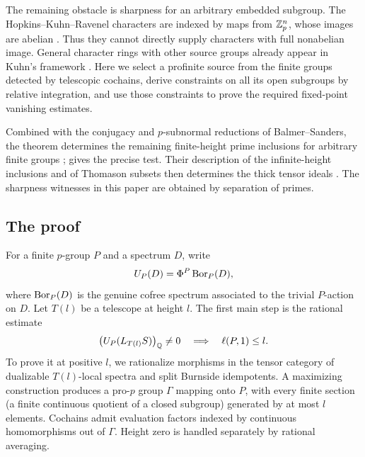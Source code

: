 The remaining obstacle is sharpness for an arbitrary embedded
subgroup. The Hopkins--Kuhn--Ravenel characters are indexed by maps
from \(\mathbb Z_p^n\), whose images are abelian \cite[Theorem~C]{HKR}.
Thus they cannot directly supply characters with full nonabelian
image. General character rings with other source groups already
appear in Kuhn's framework \cite[Section~2]{KuhnCharacters}.
Here we select a profinite source from the finite groups detected by
telescopic cochains, derive constraints on all its open subgroups by
relative integration, and use those constraints to prove the required
fixed-point vanishing estimates.

Combined with the conjugacy and \(p\)-subnormal reductions of
Balmer--Sanders, the theorem determines the remaining finite-height
prime inclusions for arbitrary finite groups
\cite[Proposition~6.11]{BS};  gives the
precise test. Their description of the infinite-height inclusions
and of Thomason subsets then determines the thick tensor ideals
\cite[Corollaries~8.19, 10.5, and~10.6]{BS}. The sharpness witnesses
in this paper are obtained by separation of primes.

\subsection*{The proof}

For a finite \(p\)-group \(P\) and a spectrum \(D\), write
\[
 U_P(D)=\Phi^P\operatorname{Bor}_P(D),
\]
where \(\operatorname{Bor}_P(D)\) is the genuine cofree spectrum associated to the trivial \(P\)-action on \(D\). Let \(T(l)\) be a telescope at height \(l\). The first main step is the rational estimate
\begin{equation}\label{eq:intro-rational}
 \bigl(U_P(L_{T(l)}S)\bigr)_{\mathbb Q}\ne0
 \quad\Longrightarrow\quad \ell(P,1)\le l.
\end{equation}
To prove it at positive \(l\), we rationalize morphisms in the tensor category of dualizable \(T(l)\)-local spectra and split Burnside idempotents. A maximizing construction produces a pro-\(p\) group \(\Gamma\) mapping onto \(P\), with every finite section (a finite continuous quotient of a closed subgroup) generated by at most \(l\) elements. Cochains admit evaluation factors indexed by continuous homomorphisms out of \(\Gamma\). Height zero is handled separately by rational averaging.

